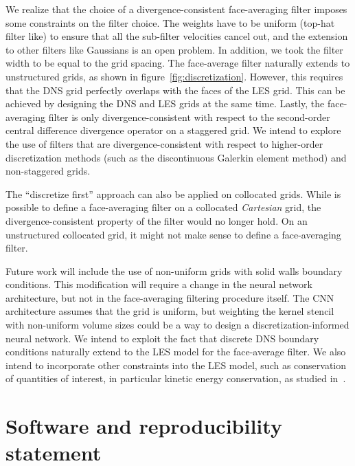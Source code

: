 \documentclass[preprint]{elsarticle}
\newcommand{\R}[1]{}
\newcommand{\revone}[1]{#1}
\begin{document}
We realize that the choice of a divergence-consistent face-averaging filter
imposes some constraints on the filter choice. The weights have to be uniform
(top-hat filter like) to ensure that all the sub-filter velocities cancel out,
and the extension to other filters like Gaussians is an open problem. In
addition, we took the filter width to be equal to the grid spacing. The
face-average filter naturally extends to unstructured grids, as shown in
figure~\ref{fig:discretization}. However, this requires that the DNS grid perfectly
overlaps with the faces of the LES grid. This can be achieved by designing the
DNS and LES grids at the same time. Lastly,
\revone{\R{novel9}  the face-averaging}
filter is only divergence-consistent with respect to the
second-order central difference divergence operator on a staggered grid. We
intend to explore the use of filters that are divergence-consistent with respect
to higher-order discretization methods (such as the discontinuous Galerkin
element method) and non-staggered grids.
\revone{
    \R{collocated}
    The ``discretize first'' approach can also be applied on collocated grids.
    While is possible to define a face-averaging filter on a collocated
    \emph{Cartesian} grid, the divergence-consistent property of the filter
    would no longer hold. On an unstructured collocated grid, it might not make
    sense to define a face-averaging filter.
}

Future work will include the use of non-uniform grids with solid walls boundary
conditions. This modification will require a change in the neural network
architecture, but not in the face-averaging filtering procedure itself. The CNN
architecture assumes that the grid is uniform, but weighting the kernel stencil
with non-uniform volume sizes could be a way to design a discretization-informed
neural network. We intend to exploit the fact that discrete DNS boundary
conditions naturally extend to the LES model for the face-average filter. We
also intend to incorporate other constraints into the LES model, such as
conservation of quantities of interest, in particular kinetic energy
conservation, as studied in~\cite{Vangastelen2023}.


\section*{Software and reproducibility statement}
\end{document}
